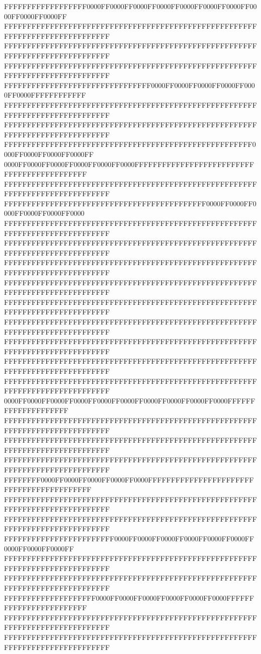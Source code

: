 FFFFFFFFFFFFFFFFFF0000FF0000FF0000FF0000FF0000FF0000FF0000FF0000FF0000FF0000FF
FFFFFFFFFFFFFFFFFFFFFFFFFFFFFFFFFFFFFFFFFFFFFFFFFFFFFFFFFFFFFFFFFFFFFFFFFFFFFF
FFFFFFFFFFFFFFFFFFFFFFFFFFFFFFFFFFFFFFFFFFFFFFFFFFFFFFFFFFFFFFFFFFFFFFFFFFFFFF
FFFFFFFFFFFFFFFFFFFFFFFFFFFFFFFFFFFFFFFFFFFFFFFFFFFFFFFFFFFFFFFFFFFFFFFFFFFFFF
FFFFFFFFFFFFFFFFFFFFFFFFFFFFFFFF0000FF0000FF0000FF0000FF0000FF0000FFFFFFFFFFFF
FFFFFFFFFFFFFFFFFFFFFFFFFFFFFFFFFFFFFFFFFFFFFFFFFFFFFFFFFFFFFFFFFFFFFFFFFFFFFF
FFFFFFFFFFFFFFFFFFFFFFFFFFFFFFFFFFFFFFFFFFFFFFFFFFFFFFFFFFFFFFFFFFFFFFFFFFFFFF
FFFFFFFFFFFFFFFFFFFFFFFFFFFFFFFFFFFFFFFFFFFFFFFFFFFFFF0000FF0000FF0000FF0000FF
0000FF0000FF0000FF0000FF0000FF0000FFFFFFFFFFFFFFFFFFFFFFFFFFFFFFFFFFFFFFFFFFFF
FFFFFFFFFFFFFFFFFFFFFFFFFFFFFFFFFFFFFFFFFFFFFFFFFFFFFFFFFFFFFFFFFFFFFFFFFFFFFF
FFFFFFFFFFFFFFFFFFFFFFFFFFFFFFFFFFFFFFFFFFFF0000FF0000FF0000FF0000FF0000FF0000
FFFFFFFFFFFFFFFFFFFFFFFFFFFFFFFFFFFFFFFFFFFFFFFFFFFFFFFFFFFFFFFFFFFFFFFFFFFFFF
FFFFFFFFFFFFFFFFFFFFFFFFFFFFFFFFFFFFFFFFFFFFFFFFFFFFFFFFFFFFFFFFFFFFFFFFFFFFFF
FFFFFFFFFFFFFFFFFFFFFFFFFFFFFFFFFFFFFFFFFFFFFFFFFFFFFFFFFFFFFFFFFFFFFFFFFFFFFF
FFFFFFFFFFFFFFFFFFFFFFFFFFFFFFFFFFFFFFFFFFFFFFFFFFFFFFFFFFFFFFFFFFFFFFFFFFFFFF
FFFFFFFFFFFFFFFFFFFFFFFFFFFFFFFFFFFFFFFFFFFFFFFFFFFFFFFFFFFFFFFFFFFFFFFFFFFFFF
FFFFFFFFFFFFFFFFFFFFFFFFFFFFFFFFFFFFFFFFFFFFFFFFFFFFFFFFFFFFFFFFFFFFFFFFFFFFFF
FFFFFFFFFFFFFFFFFFFFFFFFFFFFFFFFFFFFFFFFFFFFFFFFFFFFFFFFFFFFFFFFFFFFFFFFFFFFFF
FFFFFFFFFFFFFFFFFFFFFFFFFFFFFFFFFFFFFFFFFFFFFFFFFFFFFFFFFFFFFFFFFFFFFFFFFFFFFF
FFFFFFFFFFFFFFFFFFFFFFFFFFFFFFFFFFFFFFFFFFFFFFFFFFFFFFFFFFFFFFFFFFFFFFFFFFFFFF
0000FF0000FF0000FF0000FF0000FF0000FF0000FF0000FF0000FF0000FFFFFFFFFFFFFFFFFFFF
FFFFFFFFFFFFFFFFFFFFFFFFFFFFFFFFFFFFFFFFFFFFFFFFFFFFFFFFFFFFFFFFFFFFFFFFFFFFFF
FFFFFFFFFFFFFFFFFFFFFFFFFFFFFFFFFFFFFFFFFFFFFFFFFFFFFFFFFFFFFFFFFFFFFFFFFFFFFF
FFFFFFFFFFFFFFFFFFFFFFFFFFFFFFFFFFFFFFFFFFFFFFFFFFFFFFFFFFFFFFFFFFFFFFFFFFFFFF
FFFFFFFF0000FF0000FF0000FF0000FF0000FFFFFFFFFFFFFFFFFFFFFFFFFFFFFFFFFFFFFFFFFF
FFFFFFFFFFFFFFFFFFFFFFFFFFFFFFFFFFFFFFFFFFFFFFFFFFFFFFFFFFFFFFFFFFFFFFFFFFFFFF
FFFFFFFFFFFFFFFFFFFFFFFFFFFFFFFFFFFFFFFFFFFFFFFFFFFFFFFFFFFFFFFFFFFFFFFFFFFFFF
FFFFFFFFFFFFFFFFFFFFFFFF0000FF0000FF0000FF0000FF0000FF0000FF0000FF0000FF0000FF
FFFFFFFFFFFFFFFFFFFFFFFFFFFFFFFFFFFFFFFFFFFFFFFFFFFFFFFFFFFFFFFFFFFFFFFFFFFFFF
FFFFFFFFFFFFFFFFFFFFFFFFFFFFFFFFFFFFFFFFFFFFFFFFFFFFFFFFFFFFFFFFFFFFFFFFFFFFFF
FFFFFFFFFFFFFFFFFFFF0000FF0000FF0000FF0000FF0000FF0000FFFFFFFFFFFFFFFFFFFFFFFF
FFFFFFFFFFFFFFFFFFFFFFFFFFFFFFFFFFFFFFFFFFFFFFFFFFFFFFFFFFFFFFFFFFFFFFFFFFFFFF
FFFFFFFFFFFFFFFFFFFFFFFFFFFFFFFFFFFFFFFFFFFFFFFFFFFFFFFFFFFFFFFFFFFFFFFFFFFFFF
